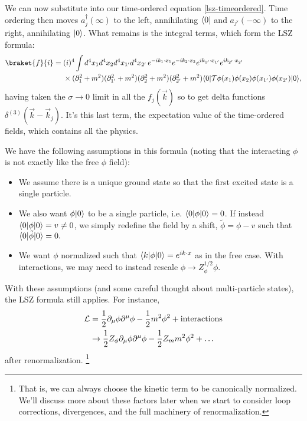 We can now substitute into our time-ordered equation \ref{lsz-timeordered}. Time ordering then moves $a_j^\dagger(\infty)$ to the left, annihilating $\langle0\rvert$ and $a_{j'}(-\infty)$ to the right, annihilating $\lvert0\rangle$. What remains is the integral terms, which form the LSZ formula:
\begin{align*}
    \braket{f}{i}={}&(i)^4 \int d^4 x_1 d^4 x_2 d^4x_{1'} d^4x_{2'}\,  e^{-ik_1\cdot x_1} e^{-ik_2 \cdot x_2} e^{ik_{1'}\cdot x_{1'}} e^{ik_{2'} \cdot x_{2'}}\\
        &\times (\p_1^2 +m^2)(\p_{1'}^2+m^2)(\p_2^2+m^2)(\p_{2'}^2 +m^2)
        \bra{0}\mathcal{T} \phi(x_1)\phi(x_2)\phi(x_{1'})\phi(x_{2'})\ket{0},
\end{align*}
having taken the $\sigma\to 0$ limit in all the $f_j(\vec k)$ so to get delta functions $\delta^{(3)}(\vec k -\vec k_j)$. It's this last term, the expectation value of the time-ordered fields, which contains all the physics.

We have the following assumptions in this formula (noting that the interacting $\phi$ is not exactly like the free $\phi$ field):
\begin{itemize}
    \item We assume there is a unique ground state so that the first excited state is a single particle.
    \item We also want $\phi\lvert0\rangle$ to be a single particle, i.e.
    $\langle0\rvert\phi \lvert0\rangle=0$. If instead $\langle0\rvert\phi\lvert0\rangle= v \neq 0$, we simply redefine the field by a shift, $\tilde \phi = \phi-v$ such that $\langle0\rvert\tilde \phi\lvert0\rangle=0.$
    \item We want $\phi$ normalized such that $\langle k\rvert\phi\lvert0\rangle=e^{ik\cdot x}$ as in the free case. With interactions, we may need to instead rescale $\phi \to Z_\phi^{1/2} \phi$. 
\end{itemize}
With these assumptions (and some careful thought about multi-particle states), the LSZ formula still applies. For instance,
\begin{align*}
    \mathcal L &= \frac{1}{2} \partial_\mu \phi \partial^\mu \phi -\frac{1}{2} m^2 \phi^2 +\text{interactions}\\
    &\to \frac{1}{2} Z_\phi \partial_\mu \phi \partial^\mu \phi-\frac{1}{2} Z_m m^2 \phi^2 +\ldots
\end{align*}
after renormalization.%
    \footnote{That is, we can always choose the kinetic term to be canonically normalized. We'll discuss more about these factors later when we start to consider loop corrections, divergences, and the full machinery of renormalization.}